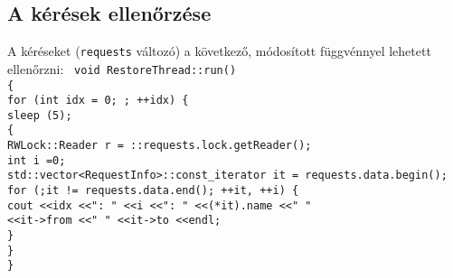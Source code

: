 \documentclass[fleqn,10pt,a4paper,titlepage]{article}
\begin{document}
  \subsection{A kérések ellenőrzése}
  A kéréseket (\texttt{requests} változó) a következő, módosított függvénnyel lehetett ellenőrzni:
  \texttt{
    void RestoreThread::run()\\
    \{\\
    \hspace*{4mm}for (int idx = 0; ; ++idx) \{\\
    \hspace*{8mm}sleep (5);\\
    \hspace*{8mm}\{\\
    \hspace*{12mm}RWLock::Reader r = ::requests.lock.getReader();\\
    \hspace*{12mm}int i =0;\\
    \hspace*{12mm}std::vector\textless RequestInfo\textgreater::const\_iterator it = requests.data.begin();\\
    \hspace*{12mm}for (;it != requests.data.end(); ++it, ++i) \{\\
    \hspace*{12mm}cout  \textless\textless  idx \textless \textless ": "   \textless\textless i \textless\textless ": "
    \textless\textless (*it).name \textless\textless " "\\
    \hspace*{20mm}\textless\textless it-\textgreater from \textless\textless " "
    \textless\textless it-\textgreater to  \textless\textless endl;\\
    \hspace*{8mm}\}\\
    \hspace*{4mm}\}\\
    \}    
  }
  
\end{document}
